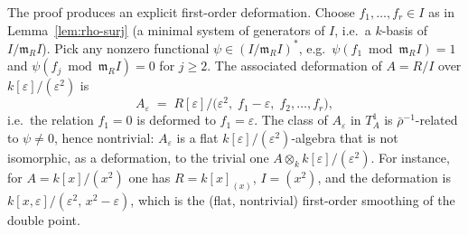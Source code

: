 \documentclass{amsart}
\begin{document}
The proof produces an explicit first-order deformation. Choose
$f_1,\dots,f_r\in I$ as in Lemma~\ref{lem:rho-surj} (a minimal system of
generators of $I$, i.e.\ a $k$-basis of $I/\mathfrak m_R I$). Pick any nonzero
functional $\psi\in(I/\mathfrak m_R I)^{*}$, e.g.\ $\psi(f_1\bmod\mathfrak m_R I)=1$
and $\psi(f_j\bmod\mathfrak m_R I)=0$ for $j\ge 2$. The associated deformation of
$A=R/I$ over $k[\varepsilon]/(\varepsilon^2)$ is
\[
A_\varepsilon \;=\; R[\varepsilon]\big/\bigl(\varepsilon^2,\;
f_1-\varepsilon,\;f_2,\dots,f_r\bigr),
\]
i.e.\ the relation $f_1=0$ is deformed to $f_1=\varepsilon$. The class of
$A_\varepsilon$ in $T^1_A$ is $\bar\rho^{-1}$-related to $\psi\neq 0$, hence
nontrivial: $A_\varepsilon$ is a flat $k[\varepsilon]/(\varepsilon^2)$-algebra
that is not isomorphic, as a deformation, to the trivial one
$A\otimes_k k[\varepsilon]/(\varepsilon^2)$. For instance, for
$A=k[x]/(x^2)$ one has $R=k[x]_{(x)}$, $I=(x^2)$, and the deformation is
$k[x,\varepsilon]/(\varepsilon^2,\,x^2-\varepsilon)$, which is the (flat,
nontrivial) first-order smoothing of the double point.
\end{document}
